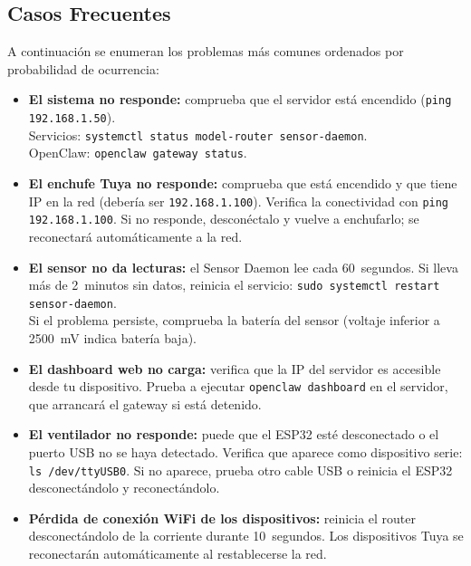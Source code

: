 \subsection{Casos Frecuentes}

A continuación se enumeran los problemas más comunes ordenados por probabilidad de ocurrencia:

\begin{itemize}
    \item \textbf{El sistema no responde:} comprueba que el servidor está encendido ({\footnotesize\texttt{ping 192.168.1.50}}).\\ Servicios: {\footnotesize\texttt{systemctl status model-router sensor-daemon}}.\\ OpenClaw: {\footnotesize\texttt{openclaw gateway status}}.

    \item \textbf{El enchufe Tuya no responde:} comprueba que está encendido y que tiene IP en la red (debería ser \texttt{192.168.1.100}). Verifica la conectividad con \texttt{ping 192.168.1.100}. Si no responde, desconéctalo y vuelve a enchufarlo; se reconectará automáticamente a la red.

    \item \textbf{El sensor no da lecturas:} el Sensor Daemon lee cada 60~segundos. Si lleva más de 2~minutos sin datos, reinicia el servicio: {\small\texttt{sudo systemctl restart sensor-daemon}}.\\ Si el problema persiste, comprueba la batería del sensor (voltaje inferior a 2500~mV indica batería baja).

    \item \textbf{El dashboard web no carga:} verifica que la IP del servidor es accesible desde tu dispositivo. Prueba a ejecutar \texttt{openclaw dashboard} en el servidor, que arrancará el gateway si está detenido.

    \item \textbf{El ventilador no responde:} puede que el ESP32 esté desconectado o el puerto USB no se haya detectado. Verifica que aparece como dispositivo serie: \texttt{ls /dev/ttyUSB0}. Si no aparece, prueba otro cable USB o reinicia el ESP32 desconectándolo y reconectándolo.

    \item \textbf{Pérdida de conexión WiFi de los dispositivos:} reinicia el router desconectándolo de la corriente durante 10~segundos. Los dispositivos Tuya se reconectarán automáticamente al restablecerse la red.


\end{itemize}
